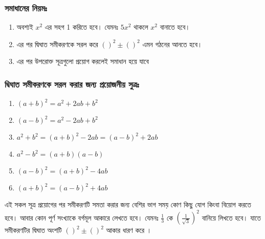 \documentclass[12pt]{article}
\begin{document}
\subsubsection*{সমাধানের নিয়মঃ}
\begin{enumerate}
\item অবশ্যই $x^2$ এর সহগ 1 করিতে হবে। যেমনঃ $5x^2$ থাকলে $x^2$ বানাতে হবে।
\item এর পর দ্বিঘাত সমীকরণকে সরল করে $()^2\pm()^2$ এমন গঠনের আনতে হবে।
\item এর পর উপরোক্ত সূত্রগুলো প্রয়োগ করলেই সমাধান হয়ে যাবে
\end{enumerate}
\subsubsection*{ দ্বিঘাত সমীকরণকে সরল করার জন্য প্রয়োজনীয় সুত্রঃ} 
\begin{enumerate}
\item $(a+b)^2=a^2+2ab+b^2$
\item $(a-b)^2=a^2-2ab+b^2$
\item $a^2+b^2=(a+b)^2-2ab =(a-b)^2+2ab$
\item $a^2-b^2=(a+b)(a-b)$
\item $(a-b)^2=(a+b)^2-4ab$
\item $(a+b)^2=(a-b)^2+4ab$
\end{enumerate}
এই সকল সূত্র প্রয়োগের পর সমীকরণটি সমতা করার জন্য বেশির ভাগ সময় কোণ কিছু যোগ কিংবা বিয়োগ করতে হবে। আবার কোন পূর্ণ সংখ্যাকে বর্গমূল আকারে লেখতে হবে। যেমনঃ $\frac{1}{3}$ কে  $(\frac{1}{\sqrt{3}})^2$ বানিয়ে লিখতে হবে। যাতে সমীকরণটির দ্বিঘাত অংশটি $()^2\pm()^2$ আকার ধারণ করে ।
\end{document}
